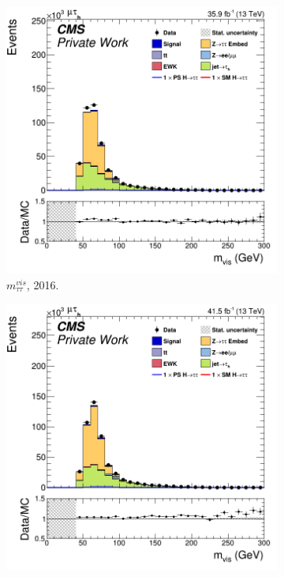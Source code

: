 \begin{figure}
    \begin{subfigure}[b]{0.33\linewidth}
    \centering
    \includegraphics[width=\linewidth]{Chapitre7/Images/CtrlPlots/2016/VisibleMass.png} 
    \caption{$m_{\tau\tau}^{vis}$, 2016.} 
    \vspace{0.5ex}
  \end{subfigure}%
  \begin{subfigure}[b]{0.33\linewidth}
    \centering
    \includegraphics[width=\linewidth]{Chapitre7/Images/CtrlPlots/2017/VisibleMass.png} 

\end{subfigure}
\end{figure}
